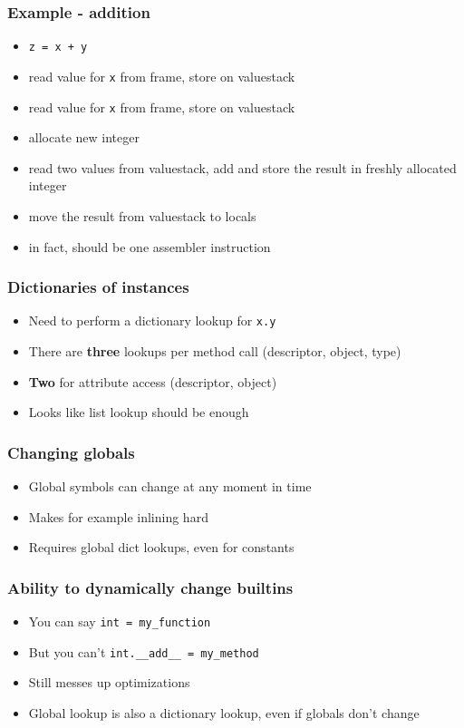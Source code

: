 \documentclass[utf8x]{beamer}
\begin{document}
\begin{frame}
  \frametitle{Example - addition}
  \begin{itemize}
    \item {\tt z = x + y}
    \item read value for {\tt x} from frame, store on valuestack
    \item read value for {\tt x} from frame, store on valuestack
    \item allocate new integer
    \item read two values from valuestack, add and store the result in
      freshly allocated integer
    \item move the result from valuestack to locals
      \pause
    \item {\color{red} in fact, should be one assembler instruction}
  \end{itemize}
\end{frame}

\begin{frame}
  \frametitle{Dictionaries of instances}
  \begin{itemize}
    \item Need to perform a dictionary lookup for {\tt x.y}
    \item There are {\bf three} lookups per method call
      (descriptor, object, type)
    \item {\bf Two} for attribute access
      (descriptor, object)
    \item Looks like list lookup should be enough
  \end{itemize}
\end{frame}

\begin{frame}
  \frametitle{Changing globals}
  \begin{itemize}
    \item Global symbols can change at any moment in time
    \item Makes for example inlining hard
    \item Requires global dict lookups, even for constants
  \end{itemize}
\end{frame}

\begin{frame}
  \frametitle{Ability to dynamically change builtins}
  \begin{itemize}
    \item You can say {\tt int = my\_function}
    \item But you can't {\tt int.\_\_add\_\_ = my\_method}
    \item Still messes up optimizations
    \item Global lookup is also a dictionary lookup, even if globals
      don't change
  \end{itemize}
\end{frame}
\end{document}
